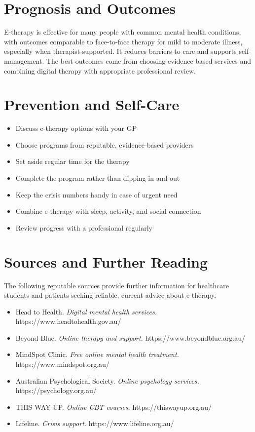\section*{Prognosis and Outcomes}
E-therapy is effective for many people with common mental health conditions, with outcomes comparable to face-to-face therapy for mild to moderate illness, especially when therapist-supported. It reduces barriers to care and supports self-management. The best outcomes come from choosing evidence-based services and combining digital therapy with appropriate professional review.

\section*{Prevention and Self-Care}
\begin{itemize}
    \item Discuss e-therapy options with your GP
    \item Choose programs from reputable, evidence-based providers
    \item Set aside regular time for the therapy
    \item Complete the program rather than dipping in and out
    \item Keep the crisis numbers handy in case of urgent need
    \item Combine e-therapy with sleep, activity, and social connection
    \item Review progress with a professional regularly
\end{itemize}

\section*{Sources and Further Reading}
The following reputable sources provide further information for healthcare students and patients seeking reliable, current advice about e-therapy.
\begin{itemize}
    \item Head to Health. \textit{Digital mental health services.} https://www.headtohealth.gov.au/
    \item Beyond Blue. \textit{Online therapy and support.} https://www.beyondblue.org.au/
    \item MindSpot Clinic. \textit{Free online mental health treatment.} https://www.mindspot.org.au/
    \item Australian Psychological Society. \textit{Online psychology services.} https://psychology.org.au/
    \item THIS WAY UP. \textit{Online CBT courses.} https://thiswayup.org.au/
    \item Lifeline. \textit{Crisis support.} https://www.lifeline.org.au/
\end{itemize}
